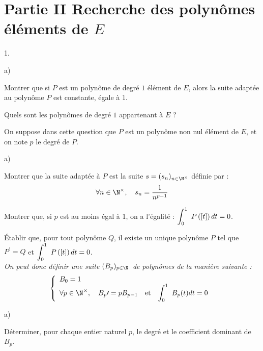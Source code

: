 \documentclass[11pt]{article}%
\begin{document}
\section*{Partie II Recherche des polynômes éléments de $E$}

\begin{noliste}{1.}
 \setlength{\itemsep}{4mm}
\item 

\begin{noliste}{a)}
 \setlength{\itemsep}{2mm}
\item Montrer que si $P$ est un polynôme de degré $1$ élément de $E$,
alors
la suite adaptée au polynôme $P$ est constante, égale à $1$.

\item Quels sont les polynômes de degré $1$ appartenant à $E$ ?
\end{noliste}

\item On suppose dans cette question que $P$ est un polynôme non nul
élément
de $E$, et on note $p$ le degré de $P$.

\begin{noliste}{a)}
 \setlength{\itemsep}{2mm}
\item Montrer que la suite adaptée à $P$ est la suite $s =
(s_{n})_{n\in
\N^{\times }}$ définie par :
\[
\forall n\in \N^{\times },\quad s_{n} = \dfrac{1}{n^{p-1}}
\]

\item Montrer que, si $p$ est au moins égal à 1, on a l'égalité :\quad
$\displaystyle \int_{0}^{1}\ P\left(\left[ {t} \right]\right)dt = 0$.
\end{noliste}

\item Établir que, pour tout polynôme $Q$, il existe un unique polynôme
$P$
tel que $P^{\prime } = Q$ et $\displaystyle \int_{0}^{1}\ P\left(\left[ {t} \right]\right)dt = 0$.\\
\textit{On peut donc définir une suite }$(B_{p})_{p\in \N}$\textit{\
de polynômes de la manière suivante : }
\[
\left\{
\begin{array}{lll}
B_{0} = 1 & & \\
\forall p\in \N^{\times },\quad B_{p}{\prime } = pB_{p-1} & \text{et}
 & \dint{0}{1}B_{p}(t)dt = 0
\end{array}
\right. \
\]

\item 

\begin{noliste}{a)}
 \setlength{\itemsep}{2mm}
\item Déterminer, pour chaque entier naturel $p$, le degré et le
coefficient
dominant de $B_{p}$.


\end{noliste}
\end{noliste}
\end{document}

